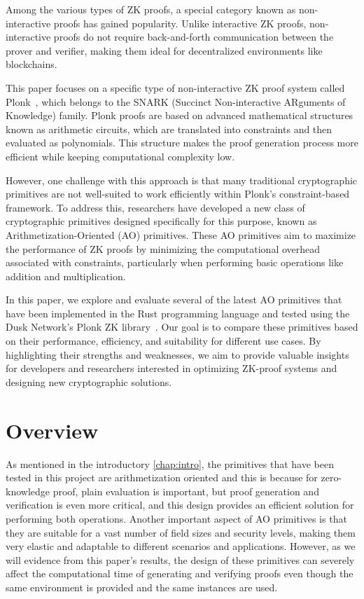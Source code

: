 \documentclass[12pt, a4paper]{report}
\begin{document}
Among the various types of ZK proofs, a special category known as non-interactive proofs has gained popularity. Unlike interactive ZK proofs, non-interactive proofs do not require back-and-forth communication between the prover and verifier, making them ideal for decentralized environments like blockchains.

This paper focuses on a specific type of non-interactive ZK proof system called \textsf{Plonk}~\cite{plonk}, which belongs to the SNARK (Succinct Non-interactive ARguments of Knowledge) family. \textsf{Plonk} proofs are based on advanced mathematical structures known as arithmetic circuits, which are translated into constraints and then evaluated as polynomials. This structure makes the proof generation process more efficient while keeping computational complexity low.

However, one challenge with this approach is that many traditional cryptographic primitives are not well-suited to work efficiently within \textsf{Plonk}'s constraint-based framework. To address this, researchers have developed a new class of cryptographic primitives designed specifically for this purpose, known as Arithmetization-Oriented (AO) primitives. These AO primitives aim to maximize the performance of ZK proofs by minimizing the computational overhead associated with constraints, particularly when performing basic operations like addition and multiplication.

In this paper, we explore and evaluate several of the latest AO primitives that have been implemented in the Rust programming language and tested using the Dusk Network's \textsf{Plonk} ZK library~\cite{dusk-plonk}. Our goal is to compare these primitives based on their performance, efficiency, and suitability for different use cases. By highlighting their strengths and weaknesses, we aim to provide valuable insights for developers and researchers interested in optimizing ZK-proof systems and designing new cryptographic solutions.

\chapter{Overview}\label{chap:overview}

As mentioned in the introductory \autoref{chap:intro}, the primitives that have been tested in this project are arithmetization oriented and this is because for zero-knowledge proof, plain evaluation is important, but proof generation and verification is even more critical, and this design provides an efficient solution for performing both operations.
Another important aspect of AO primitives is that they are suitable for a vast number of field sizes and security levels, making them very elastic and adaptable to different scenarios and applications.
However, as we will evidence from this paper's results, the design of these primitives can severely affect the computational time of generating and verifying proofs even though the same environment is provided and the same instances are used.
\end{document}
